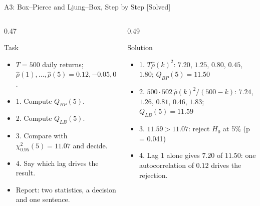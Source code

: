 \begin{frame}{A3: Box--Pierce and Ljung--Box, Step by Step [Solved]}
\itemsize{\scriptsize}
\begin{columns}[T]
\begin{column}{0.47\textwidth}
\begin{block}{Task}
\begin{itemize}
    \item $T = 500$ daily returns; $\hat\rho(1), \dots, \hat\rho(5) = 0.12, -0.05, 0.04, 0.03, -0.06$.
    \item 1. Compute $Q_{BP}(5)$.
    \item 2. Compute $Q_{LB}(5)$.
    \item 3. Compare with $\chi^2_{0.95}(5) = 11.07$ and decide.
    \item 4. Say which lag drives the result.
    \item Report: two statistics, a decision and one sentence.
\end{itemize}
\end{block}
\end{column}
\begin{column}{0.49\textwidth}
\begin{exampleblock}{Solution}
\begin{itemize}
    \item 1. $T\hat\rho(k)^2$: $7.20$, $1.25$, $0.80$, $0.45$, $1.80$; $Q_{BP}(5) = 11.50$
    \item 2. $500 \cdot 502\,\hat\rho(k)^2/(500 - k)$: $7.24$, $1.26$, $0.81$, $0.46$, $1.83$; $Q_{LB}(5) = 11.59$
    \item 3. $11.59 > 11.07$: reject $H_0$ at 5\% (p = 0.041)
    \item 4. Lag 1 alone gives $7.20$ of $11.50$: one autocorrelation of $0.12$ drives the rejection.
\end{itemize}
\end{exampleblock}
\end{column}
\end{columns}
\end{frame}

